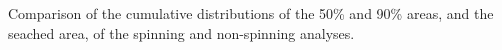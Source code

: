 \label{fig:sky} Comparison of the cumulative distributions of the 50\% and 90\% areas, and the seached area, of the spinning and non-spinning analyses.